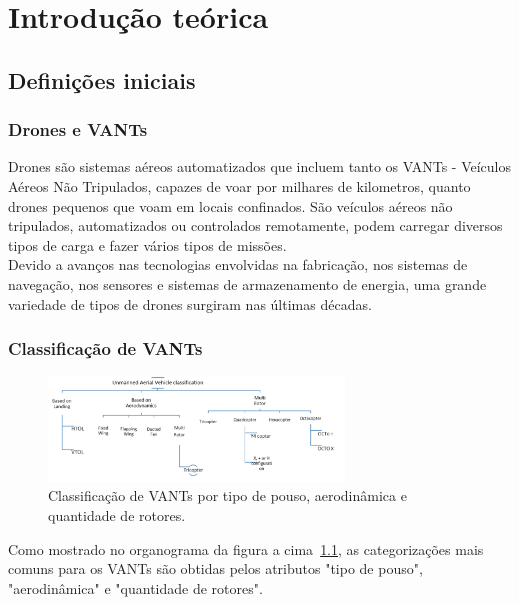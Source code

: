 \documentclass[12pt,a4paper,oneside]{book}
\begin{document}
%

\chapter{Introdução teórica}
%
\thispagestyle{empty} 
%


\section{Definições iniciais}

\subsection{Drones e VANTs}
Drones são sistemas aéreos automatizados que incluem tanto os VANTs - Veículos Aéreos Não Tripulados, capazes de voar por milhares de 
kilometros, quanto drones pequenos que voam em locais confinados. São veículos aéreos não tripulados, automatizados ou controlados 
remotamente, podem carregar diversos tipos de carga e fazer vários tipos de missões.\\
Devido a avanços nas tecnologias envolvidas na fabricação, nos sistemas de navegação, nos sensores e sistemas de armazenamento de 
energia, uma grande variedade de tipos de drones surgiram nas últimas décadas. 

\subsection{Classificação de VANTs}

\begin{figure}[!htbp]
  \centering
  \includegraphics[width=0.7\textwidth]{Images/introducao/drone_classification.png}
  \caption{Classificação de VANTs por tipo de pouso, aerodinâmica e quantidade de rotores.}
  \label{fig:drone_classification.png}
\end{figure}

Como mostrado no organograma da figura a cima~\ref{fig:drone_classification.png}, as categorizações mais comuns para os VANTs são obtidas pelos atributos "tipo de pouso", "aerodinâmica" e "quantidade de rotores".
\end{document}
